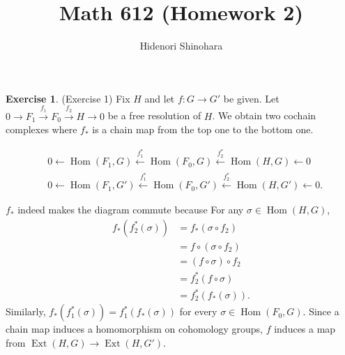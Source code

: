\documentclass[12pt, psamsfonts]{amsart}
\theoremstyle{definition}
\newtheorem*{exer}{Exercise}
\theoremstyle{remark}
\DeclareMathOperator{\Hom}{Hom}
\DeclareMathOperator{\Ext}{Ext}
\DeclareMathOperator{\Hom}{Hom}
\numberwithin{equation}{section}
\begin{document}
\title{Math 612 (Homework 2)}
\author{Hidenori Shinohara}
\maketitle

\begin{exer}{(Exercise 1)}
  Fix $H$ and let $f: G \rightarrow G'$ be given.
  Let $0 \rightarrow F_1 \xrightarrow{f_1} F_0 \xrightarrow{f_2} H \rightarrow 0$ be a free resolution of $H$.
  We obtain two cochain complexes where $f_{\ast}$ is a chain map from the top one to the bottom one.

  \begin{align*}
    &0 \leftarrow \Hom(F_1, G) \xleftarrow{f_1^{\ast}} \Hom(F_0, G) \xleftarrow{f_2^{\ast}} \Hom(H, G) \leftarrow 0 \\
    &0 \leftarrow \Hom(F_1, G') \xleftarrow{f_1^{\ast}} \Hom(F_0, G') \xleftarrow{f_2^{\ast}} \Hom(H, G') \leftarrow 0.
  \end{align*}

  $f_{\ast}$ indeed makes the diagram commute because
  For any $\sigma \in \Hom(H, G)$,
  \begin{align*} 
    f_{\ast}(f_2^{\ast}(\sigma))
      &= f_{\ast}(\sigma \circ f_2) \\
      &= f \circ (\sigma \circ f_2) \\
      &= (f \circ \sigma) \circ f_2 \\
      &= f_2^{\ast}(f \circ \sigma) \\
      &= f_2^{\ast}(f_{\ast}(\sigma)).
  \end{align*}
  Similarly, $f_{\ast}(f_1^{\ast}(\sigma)) = f_1^{\ast}(f_{\ast}(\sigma))$ for every $\sigma \in \Hom(F_0, G)$.
  Since a chain map induces a homomorphism on cohomology groups, $f$ induces a map from $\Ext(H, G) \rightarrow \Ext(H, G')$.
\end{exer}
\end{document}
